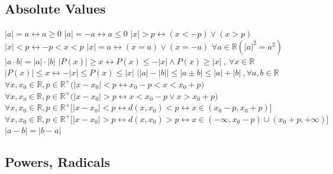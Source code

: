 \documentclass[12pt]{article}
\begin{document}
\begin{flushleft}
	\subsection{Absolute Values} 
	
	\textbullet \quad $ |a| = a \leftrightarrow a \geq 0 $ \linebreak 
	\textbullet \quad $ |a| = -a \leftrightarrow a \leq 0 $ \linebreak
	\textbullet \quad $ |x| > p \leftrightarrow (x < -p) \lor (x > p) $ \linebreak 
	\textbullet \quad $ |x| < p \leftrightarrow -p < x < p $ \linebreak 
	\textbullet \quad $ |x| = a \leftrightarrow (x = a) \lor  (x = -a) $ \linebreak 
	\textbullet \quad $\displaystyle  \forall a \in \mathbb{R} (|a|^2 = a^2) $  \linebreak 
	\textbullet \quad $\displaystyle  |a\cdot b| = |a|\cdot |b| $ \linebreak 
	\textbullet \quad $\displaystyle  |P(x) | \geq x \leftrightarrow P(x) \leq -|x| \land P(x) \geq |x|\ , \ \forall x \in \mathbb{R} $ \linebreak 
	\textbullet \quad $\displaystyle  |P(x)| \leq x \leftrightarrow -|x| \leq P(x) \leq |x| $ \linebreak 
	\textbullet \quad $	\big| |a| - |b| \big| \leq |a \pm b | \leq |a| + |b| \ , \forall a, b \in \mathbb{R} $ \linebreak 
	\textbullet \quad $\displaystyle  \forall x, x_0 \in \mathbb{R} , p \in \mathbb{R}^+ \big( | x - x_0| < p \leftrightarrow x_0 - p < x < x_0 + p \big) $ \linebreak 
	\textbullet \quad $\displaystyle  \forall x, x_o \in \mathbb{R} , p \in \mathbb{R}^+ \big( | x - x_0| > p \leftrightarrow x < x_0 - p \lor x > x_0 + p \big) $ \linebreak 
	\textbullet \quad $\displaystyle  \forall x, x_0 \in \mathbb{R}, p \in \mathbb{R}^+ \big[ |x-x_0| < p \leftrightarrow d(x,x_0) < p \leftrightarrow x \in (x_0 -p, x_0 + p) \big] $ \linebreak 
	\textbullet \quad\ $\displaystyle  \forall x, x_0 \in \mathbb{R}, p  \in \mathbb{R}^+ \big[ |x-x_0| > p \leftrightarrow d(x, x_0) > p \leftrightarrow x\in (- \infty, x_0 - p ) \cup (x_0 + p, + \infty ) \big] $ \linebreak 
	\textbullet \quad $ |a -b | = |b -a| $ \linebreak 
	
	\subsection{Powers, Radicals} 
	

\end{flushleft}
\end{document}
